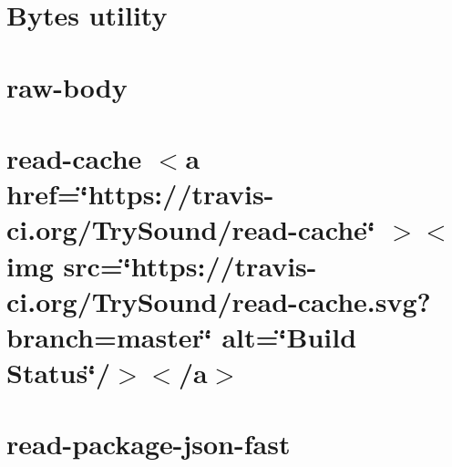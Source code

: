 \documentclass[twoside]{book}
\newcommand{\+}{\discretionary{\mbox{\scriptsize$\hookleftarrow$}}{}{}}
\begin{document}
\chapter{Bytes utility}
\label{md__c___users_vaishnavi_jadhav__desktop__developer_code_mean_stack_example_client_node_modules_rcd909d3b907a2a8f8d5b545b97931106}

\chapter{raw-\/body}
\label{md__c___users_vaishnavi_jadhav__desktop__developer_code_mean_stack_example_client_node_modules_raw_body__r_e_a_d_m_e}

\chapter{read-\/cache \texorpdfstring{$<$}{<}a href=\char`\"{}https\+://travis-\/ci.\+org/\+Try\+Sound/read-\/cache\char`\"{} \texorpdfstring{$>$}{>}\texorpdfstring{$<$}{<}img src=\char`\"{}https\+://travis-\/ci.\+org/\+Try\+Sound/read-\/cache.\+svg?branch=master\char`\"{} alt=\char`\"{}\+Build Status\char`\"{}/\texorpdfstring{$>$}{>}\texorpdfstring{$<$}{<}/a\texorpdfstring{$>$}{>}}
\label{md__c___users_vaishnavi_jadhav__desktop__developer_code_mean_stack_example_client_node_modules_read_cache__r_e_a_d_m_e}

\chapter{read-\/package-\/json-\/fast}
\label{md__c___users_vaishnavi_jadhav__desktop__developer_code_mean_stack_example_client_node_modules_r740ff0c5d5bb5391184cb2bab0a94cc1}

\end{document}
